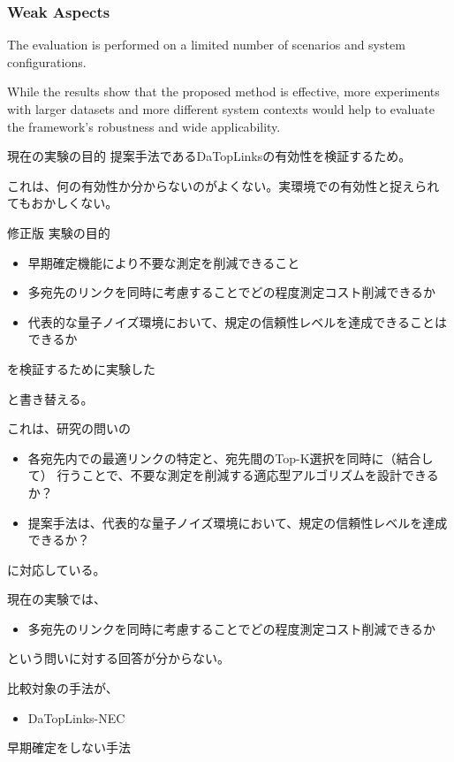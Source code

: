 \documentclass[conference]{IEEEtran}
\begin{document}
\subsubsection{Weak Aspects}
\label{sec:org3b0c595}
The evaluation is performed on a limited number of scenarios and system configurations.

While the results show that the proposed method is effective, more
experiments with larger datasets and more different system contexts
would help to evaluate the framework's robustness and wide applicability.

現在の実験の目的
提案手法であるDaTopLinksの有効性を検証するため。

これは、何の有効性か分からないのがよくない。実環境での有効性と捉えられ
てもおかしくない。

修正版 実験の目的

\begin{itemize}
\item 早期確定機能により不要な測定を削減できること

\item 多宛先のリンクを同時に考慮することでどの程度測定コスト削減できるか

\item 代表的な量子ノイズ環境において、規定の信頼性レベルを達成できることは
できるか
\end{itemize}

を検証するために実験した

と書き替える。

これは、研究の問いの

\begin{itemize}
\item 各宛先内での最適リンクの特定と、宛先間のTop-K選択を同時に（結合して）
行うことで、不要な測定を削減する適応型アルゴリズムを設計できるか？

\item 提案手法は、代表的な量子ノイズ環境において、規定の信頼性レベルを達成できるか？
\end{itemize}

に対応している。

現在の実験では、
\begin{itemize}
\item 多宛先のリンクを同時に考慮することでどの程度測定コスト削減できるか
\end{itemize}
という問いに対する回答が分からない。

比較対象の手法が、

\begin{itemize}
\item DaTopLinks-NEC
\end{itemize}
早期確定をしない手法
\end{document}
